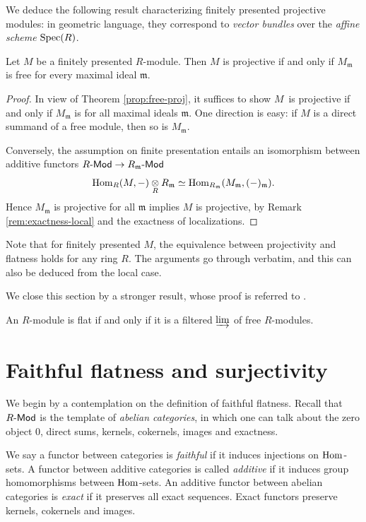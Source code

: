 We deduce the following result characterizing finitely presented projective modules: in geometric language, they correspond to \emph{vector bundles} over the \emph{affine scheme} $\operatorname{Spec}(R)$.
\begin{corollary}
	Let $M$ be a finitely presented $R$-module. Then $M$ is projective if and only if $M_{\mathfrak{m}}$ is free for every maximal ideal $\mathfrak{m}$.
\end{corollary}
\begin{proof}
	In view of Theorem \ref{prop:free-proj}, it suffices to show $M$~is projective if and only if $M_{\mathfrak{m}}$ is for all maximal ideals $\mathfrak{m}$. One direction is easy: if $M$ is a direct summand of a free module, then so is $M_{\mathfrak{m}}$.

	Conversely, the assumption on finite presentation entails an isomorphism between additive functors $R\text{-}\mathsf{Mod} \to R_{\mathfrak{m}}\text{-}\mathsf{Mod}$
	\[ \operatorname{Hom}_R(M, -) \underset{R}{\otimes} R_{\mathfrak{m}} \simeq \operatorname{Hom}_{R_{\mathfrak{m}}}(M_{\mathfrak{m}}, (-)_{\mathfrak{m}}). \]
	Hence $M_{\mathfrak{m}}$ is projective for all $\mathfrak{m}$ implies $M$ is projective, by Remark \ref{rem:exactness-local} and the exactness of localizations.
\end{proof}

Note that for finitely presented $M$, the equivalence between projectivity and flatness holds for any ring $R$. The arguments go through verbatim, and this can also be deduced from the local case.

We close this section by a stronger result, whose proof is referred to \cite[Theorem A6.6]{Eis95}.
\begin{theorem}
	An $R$-module is flat if and only if it is a filtered $\varinjlim$ of free $R$-modules.
\end{theorem}

\section{Faithful flatness and surjectivity}
We begin by a contemplation on the definition of faithful flatness. Recall that $R\text{-}\mathsf{Mod}$ is the template of \emph{abelian categories}, in which one can talk about the zero object $0$, direct sums, kernels, cokernels, images and exactness.

We say a functor between categories is \emph{faithful} if it induces injections on $\operatorname{Hom}$-sets. A functor between additive categories is called \emph{additive} if it induces group homomorphisms between $\operatorname{Hom}$-sets. An additive functor between abelian categories is \emph{exact} if it preserves all exact sequences. Exact functors preserve kernels, cokernels and images.

